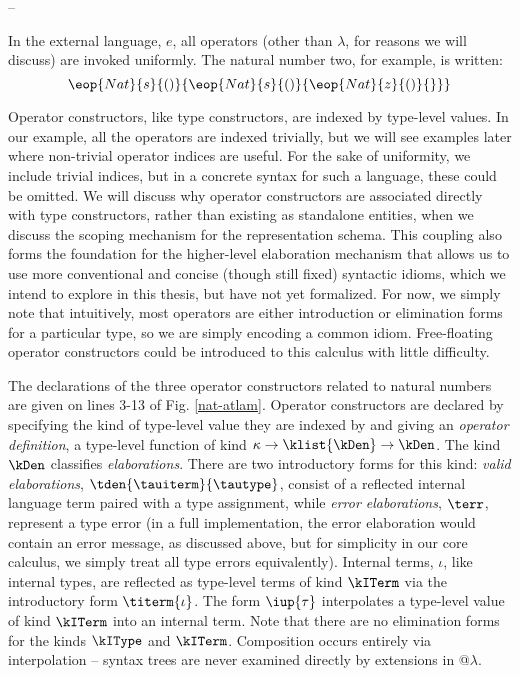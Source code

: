 
--

In the external language, $e$, all operators (other than $\lambda$, for reasons we will discuss) are invoked uniformly. The natural number two, for example, is written: $$\eop{Nat}{s}{()}{\eop{Nat}{s}{()}{\eop{Nat}{z}{()}{ }}}$$

Operator constructors, like type constructors, are indexed by type-level values. In our example, all the operators are indexed trivially, but we will see examples later where non-trivial operator indices are useful. For the sake of uniformity, we include trivial indices, but in a concrete syntax for such a language, these could be omitted. We will discuss why operator constructors are associated directly with type constructors, rather than existing as standalone entities, when we discuss the scoping mechanism for the representation schema. This coupling also forms the foundation for the higher-level elaboration mechanism that allows us to use more conventional and concise (though still fixed) syntactic idioms, which we intend to explore in this thesis, but have not yet formalized. For now, we simply note that intuitively, most operators are either introduction or elimination forms for a particular type, so we are simply encoding a common idiom. Free-floating operator constructors could be introduced to this calculus with little difficulty.

The declarations of the three operator constructors related to natural numbers are given on lines 3-13 of Fig. \ref{nat-atlam}. Operator constructors are declared by specifying the kind of type-level value they are indexed by and giving an \emph{operator definition}, a type-level function of kind $\kappa \rightarrow \klist{\kDen} \rightarrow \kDen$. The kind $\kDen$ classifies \emph{elaborations}. There are two introductory forms for this kind: \emph{valid elaborations}, $\tden{\tauiterm}{\tautype}$, consist of a reflected internal language term paired with a type assignment, while \emph{error elaborations}, $\terr$, represent a type error (in a full implementation, the error elaboration would contain an error message, as discussed above, but for simplicity in our core calculus, we simply treat all type errors equivalently). Internal terms, $\iota$, like internal types, are reflected as type-level terms of kind $\kITerm$ via the introductory form $\titerm{\iota}$. The form $\iup{\tau}$ interpolates a type-level value of kind $\kITerm$ into an internal term.  Note that there are no elimination forms for the kinds $\kIType$ and $\kITerm$. Composition occurs entirely via interpolation -- syntax trees are never examined directly by extensions in @$\lambda$. 

